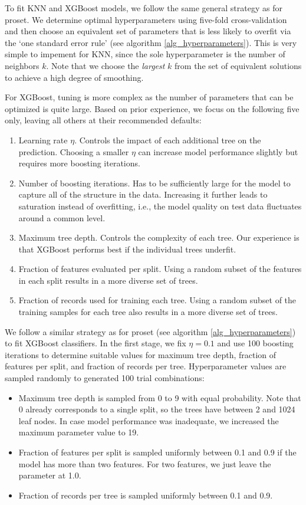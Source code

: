 %
To fit KNN and XGBoost models, we follow the same general strategy as for proset.
We determine optimal hyperparameters using five-fold cross-validation and then choose an equivalent set of parameters that is less likely to overfit via the `one standard error rule' (see algorithm \ref{alg_hyperparameters}).
This is very simple to impement for KNN, since the sole hyperparameter is the number of neighbors $k$.
Note that we choose the \textit{largest} $k$ from the set of equivalent solutions to achieve a high degree of smoothing.\par
%
For XGBoost, tuning is more complex as the number of parameters that can be optimized is quite large.
Based on prior experience, we focus on the following five only, leaving all others at their recommended defaults:
%
\begin{enumerate}
\item Learning rate $\eta$.
Controls the impact of each additional tree on the prediction.
Choosing a smaller $\eta$ can increase model performance slightly but requires more boosting iterations.
%
\item Number of boosting iterations.
Has to be sufficiently large for the model to capture all of the structure in the data.
Increasing it further leads to saturation instead of overfitting, i.e., the model quality on test data fluctuates around a common level.
%
\item Maximum tree depth.
Controls the complexity of each tree.
Our experience is that XGBoost performs best if the individual trees underfit.
%
\item Fraction of features evaluated per split.
Using a random subset of the features in each split results in a more diverse set of trees.
%
\item Fraction of records used for training each tree.
Using a random subset of the training samples for each tree also results in a more diverse set of trees.
\end{enumerate}
%
We follow a similar strategy as for proset (see algorithm \ref{alg_hyperparameters}) to fit XGBoost classifiers.
In the first stage, we fix $\eta=0.1$ and use 100 boosting iterations to determine suitable values for maximum tree depth, fraction of features per split, and fraction of records per tree.
Hyperparameter values are sampled randomly to generated 100 trial combinations:
%
\begin{itemize}
\item Maximum tree depth is sampled from 0 to 9 with equal probability.
Note that 0 already corresponds to a single split, so the trees have between 2 and 1024 leaf nodes.
In case model performance was inadequate, we increased the maximum parameter value to 19.
%
\item Fraction of features per split is sampled uniformly between 0.1 and 0.9 if the model has more than two features.
For two features, we just leave the parameter at 1.0.
%
\item Fraction of records per tree is sampled uniformly between 0.1 and 0.9.
\end{itemize}
